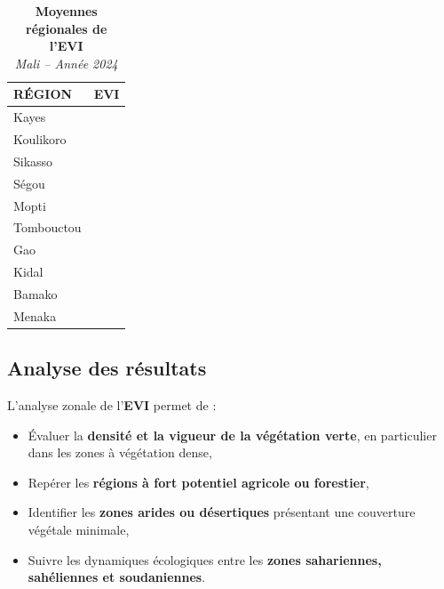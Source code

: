 \documentclass[
]{book}
\providecommand{\tightlist}{%
  \setlength{\itemsep}{0pt}\setlength{\parskip}{0pt}}
\begin{document}
\begin{table}[!t]
\caption*{
{\large \textbf{Moyennes régionales de l'EVI}} \\ 
{\small \emph{Mali -- Année 2024}}
} 
\fontsize{12.0pt}{14.4pt}\selectfont
\begin{tabular*}{\linewidth}{@{\extracolsep{\fill}}lr}
\toprule
{RÉGION} & {EVI} \\ 
\midrule\addlinespace[2.5pt]
Kayes & {\cellcolor[HTML]{13753D}{\textcolor[HTML]{FFFFFF}{0.26}}} \\ 
Koulikoro & {\cellcolor[HTML]{228342}{\textcolor[HTML]{FFFFFF}{0.24}}} \\ 
Sikasso & {\cellcolor[HTML]{004529}{\textcolor[HTML]{FFFFFF}{0.30}}} \\ 
Ségou & {\cellcolor[HTML]{4FB163}{\textcolor[HTML]{FFFFFF}{0.21}}} \\ 
Mopti & {\cellcolor[HTML]{8DCF81}{\textcolor[HTML]{000000}{0.18}}} \\ 
Tombouctou & {\cellcolor[HTML]{FEFFE2}{\textcolor[HTML]{000000}{0.09}}} \\ 
Gao & {\cellcolor[HTML]{FAFDC9}{\textcolor[HTML]{000000}{0.10}}} \\ 
Kidal & {\cellcolor[HTML]{FFFFE5}{\textcolor[HTML]{000000}{0.08}}} \\ 
Bamako & {\cellcolor[HTML]{AEDE8F}{\textcolor[HTML]{000000}{0.16}}} \\ 
Menaka & {\cellcolor[HTML]{FAFDC6}{\textcolor[HTML]{000000}{0.10}}} \\ 
\bottomrule
\end{tabular*}
\end{table}

\subsection{Analyse des résultats}\label{analyse-des-ruxe9sultats-6}

L'analyse zonale de l'\textbf{EVI} permet de :

\begin{itemize}
\tightlist
\item
  Évaluer la \textbf{densité et la vigueur de la végétation verte}, en particulier dans les zones à végétation dense,
\item
  Repérer les \textbf{régions à fort potentiel agricole ou forestier},
\item
  Identifier les \textbf{zones arides ou désertiques} présentant une couverture végétale minimale,
\item
  Suivre les dynamiques écologiques entre les \textbf{zones sahariennes, sahéliennes et soudaniennes}.
\end{itemize}
\end{document}

